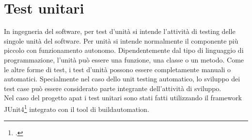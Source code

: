 \section{Test unitari}\label{sec:test-unitari}
In ingegneria del software, per test d’unità si intende l’attività di testing delle
singole unità del software.
Per unità si intende normalmente il componente più piccolo con funzionamento autonomo.
Dipendentemente dal tipo di linguaggio di programmazione, l’unità può essere una funzione, una classe o un metodo.
Come le altre forme di test, i test d’unità possono essere completamente manuali o automatici.
Specialmente nel caso dello unit testing automatico, lo sviluppo dei test case può essere considerato parte integrante dell’attività di sviluppo.\\
Nel caso del progetto \gls{apat} i test unitari sono stati fatti utilizzando il framework JUnit4\footcite{site:junit4} integrato con il tool di \gls{buildautomation}.

\setcounter{rowcount}{0}

\setcounter{testCounter}{0}

